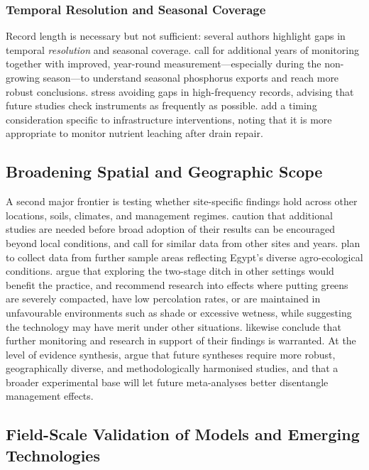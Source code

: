 \documentclass[11pt]{article}
\begin{document}
\subsubsection{Temporal Resolution and Seasonal Coverage}

Record length is necessary but not sufficient: several authors highlight gaps in temporal \emph{resolution} and seasonal coverage. \textcite{Klaiber2020} call for additional years of monitoring together with improved, year-round measurement---especially during the non-growing season---to understand seasonal phosphorus exports and reach more robust conclusions. \textcite{Hodaj2017} stress avoiding gaps in high-frequency records, advising that future studies check instruments as frequently as possible. \textcite{Wesström2015} add a timing consideration specific to infrastructure interventions, noting that it is more appropriate to monitor nutrient leaching after drain repair.

\subsection{Broadening Spatial and Geographic Scope}

A second major frontier is testing whether site-specific findings hold across other locations, soils, climates, and management regimes. \textcite{Menegaz2025} caution that additional studies are needed before broad adoption of their results can be encouraged beyond local conditions, and \textcite{Zimmerman2017b} call for similar data from other sites and years. \textcite{Ali2001} plan to collect data from further sample areas reflecting Egypt's diverse agro-ecological conditions. \textcite{Hodaj2017} argue that exploring the two-stage ditch in other settings would benefit the practice, and \textcite{Bigelow2001} recommend research into effects where putting greens are severely compacted, have low percolation rates, or are maintained in unfavourable environments such as shade or excessive wetness, while suggesting the technology may have merit under other situations. \textcite{Terrado2015} likewise conclude that further monitoring and research in support of their findings is warranted. At the level of evidence synthesis, \textcite{Wu2025} argue that future syntheses require more robust, geographically diverse, and methodologically harmonised studies, and that a broader experimental base will let future meta-analyses better disentangle management effects.

\subsection{Field-Scale Validation of Models and Emerging Technologies}
\end{document}
